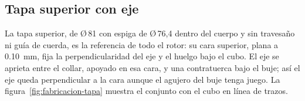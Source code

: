 \subsection{Tapa superior con eje}\label{sec:fabricacion-tapa}

La tapa superior, de Ø\,81 con espiga de Ø\,76,4 dentro del cuerpo y sin travesaño ni guía de cuerda,
es la referencia de todo el rotor: su cara superior, plana a
\SI{0.10}{mm}, fija la perpendicularidad del eje y el huelgo bajo el cubo. El eje se aprieta
entre el collar, apoyado en esa cara, y una contratuerca bajo el buje; así el eje queda
perpendicular a la cara aunque el agujero del buje tenga juego. La figura~\ref{fig:fabricacion-tapa}
muestra el conjunto con el cubo en línea de trazos.

